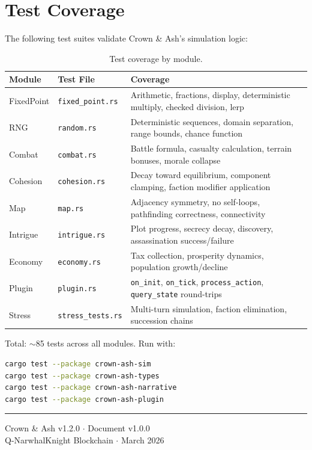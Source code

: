 \documentclass[a4paper, 11pt]{article}
\newcommand{\docversion}{1.0.0}
\newcommand{\simversion}{1.2.0}
\newcommand{\testcount}{$\sim$85}
\begin{document}
\section{Test Coverage}
\label{app:tests}

The following test suites validate Crown \& Ash's simulation logic:

\begin{table}[htbp]
\centering
\caption{Test coverage by module.}
\label{tab:tests}
\begin{tabular}{@{}llp{5.5cm}@{}}
\toprule
\textbf{Module} & \textbf{Test File} & \textbf{Coverage} \\
\midrule
FixedPoint    & \texttt{fixed\_point.rs}  & Arithmetic, fractions, display, deterministic multiply, checked division, lerp \\
RNG           & \texttt{random.rs}        & Deterministic sequences, domain separation, range bounds, chance function \\
Combat        & \texttt{combat.rs}        & Battle formula, casualty calculation, terrain bonuses, morale collapse \\
Cohesion      & \texttt{cohesion.rs}      & Decay toward equilibrium, component clamping, faction modifier application \\
Map           & \texttt{map.rs}           & Adjacency symmetry, no self-loops, pathfinding correctness, connectivity \\
Intrigue      & \texttt{intrigue.rs}      & Plot progress, secrecy decay, discovery, assassination success/failure \\
Economy       & \texttt{economy.rs}       & Tax collection, prosperity dynamics, population growth/decline \\
Plugin        & \texttt{plugin.rs}        & \texttt{on\_init}, \texttt{on\_tick}, \texttt{process\_action}, \texttt{query\_state} round-trips \\
Stress        & \texttt{stress\_tests.rs} & Multi-turn simulation, faction elimination, succession chains \\
\bottomrule
\end{tabular}
\end{table}

Total: \testcount{} tests across all modules. Run with:

\begin{lstlisting}[language=bash, numbers=none]
cargo test --package crown-ash-sim
cargo test --package crown-ash-types
cargo test --package crown-ash-narrative
cargo test --package crown-ash-plugin
\end{lstlisting}


\vspace{1cm}
\begin{center}
\textcolor{cashcopper}{\rule{0.5\textwidth}{0.5pt}}

\vspace{0.3cm}
{\small\textcolor{cashiron}{
  Crown \& Ash v\simversion{} $\cdot$ Document v\docversion{}\\
  Q-NarwhalKnight Blockchain $\cdot$ March 2026
}}
\end{center}
\end{document}
